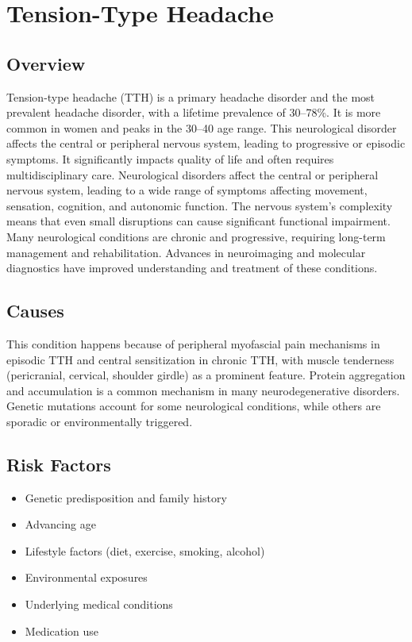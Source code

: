 \chapter{Tension-Type Headache}
\label{sec:Tension-Type Headache}

\section{Overview}
Tension-type headache (TTH) is a primary headache disorder and the most prevalent headache disorder, with a lifetime prevalence of 30--78\%. It is more common in women and peaks in the 30--40 age range. This neurological disorder affects the central or peripheral nervous system, leading to progressive or episodic symptoms. It significantly impacts quality of life and often requires multidisciplinary care. Neurological disorders affect the central or peripheral nervous system, leading to a wide range of symptoms affecting movement, sensation, cognition, and autonomic function. The nervous system's complexity means that even small disruptions can cause significant functional impairment. Many neurological conditions are chronic and progressive, requiring long-term management and rehabilitation. Advances in neuroimaging and molecular diagnostics have improved understanding and treatment of these conditions.
\section{Causes}
This condition happens because of peripheral myofascial pain mechanisms in episodic TTH and central sensitization in chronic TTH, with muscle tenderness (pericranial, cervical, shoulder girdle) as a prominent feature.    Protein aggregation and accumulation is a common mechanism in many neurodegenerative disorders.  Genetic mutations account for some neurological conditions, while others are sporadic or environmentally triggered.   
\section{Risk Factors}
\begin{itemize}[noitemsep]
  \item Genetic predisposition and family history
  \item Advancing age
  \item Lifestyle factors (diet, exercise, smoking, alcohol)
  \item Environmental exposures
  \item Underlying medical conditions
  \item Medication use
\end{itemize}
